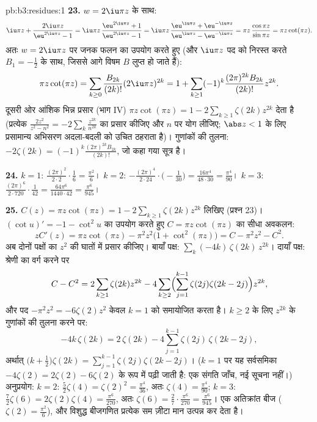 \begin{solution}{pb:b3:residues:1}
\textbf{23.} $w = 2\iu\pi z$ के साथ:
\[
\iu\pi z + \frac{2\iu\pi z}{\eu^{2\iu\pi z} - 1}
= \iu\pi z\,\frac{\eu^{2\iu\pi z} + 1}{\eu^{2\iu\pi z} - 1}
= \iu\pi z\,\frac{\eu^{\iu\pi z} +
\eu^{-\iu\pi z}}{\eu^{\iu\pi z} - \eu^{-\iu\pi z}}
= \pi z\,\frac{\cos\pi z}{\sin\pi z} = \pi z\cot(\pi z) .
\]
अतः $w = 2\iu\pi z$ पर जनक फलन का उपयोग करते हुए (और $\iu\pi z$ पद को निरस्त करते
$B_1 = -\frac12$ के साथ, जिससे आगे विषम $B$ लुप्त हो जाते हैं):
\[
\pi z\cot(\pi z) = \sum_{k\geq0}\frac{B_{2k}}{(2k)!}
(2\iu\pi z)^{2k}
= 1 + \sum_{k\geq1}(-1)^k\frac{(2\pi)^{2k}B_{2k}}{(2k)!}
z^{2k} .
\]
दूसरी ओर आंशिक भिन्न प्रसार (भाग IV) $\pi z\cot(\pi z) = 1 - 2\sum_{k\geq1}\zeta(2k)z^{2k}$ देता है (प्रत्येक $\frac{2z^2}{z^2 - n^2} =
-2\sum_k\frac{z^{2k}}{n^{2k}}$
का प्रसार कीजिए और $n$ पर योग लीजिए; $\abs z < 1$ के लिए प्रसामान्य अभिसरण
अदला-बदली को उचित ठहराता है)। गुणांकों की तुलना: $-2\zeta(2k) =
(-1)^k\frac{(2\pi)^{2k}B_{2k}}{(2k)!}$, जो कहा गया
सूत्र है।

\textbf{24.} $k = 1$: $\frac{(2\pi)^2}{2\cdot2}\cdot\frac16
= \frac{\pi^2}6$। $k = 2$: $-\frac{(2\pi)^4}{2\cdot24}
\cdot\bigl(-\frac1{30}\bigr) = \frac{16\pi^4}{48\cdot30} =
\frac{\pi^4}{90}$। $k = 3$: $\frac{(2\pi)^6}{2\cdot720}
\cdot\frac1{42} = \frac{64\pi^6}{1440\cdot42} =
\frac{\pi^6}{945}$।

\textbf{25.} $C(z) = \pi z\cot(\pi z) = 1 -
2\sum_{k\geq1}\zeta(2k)z^{2k}$ लिखिए (प्रश्न 23)। $(\cot u)'
= -1 - \cot^2u$ का उपयोग करते हुए $C = \pi z\cot(\pi z)$
का सीधा अवकलन:
\[
zC'(z) = \pi z\cot(\pi z) - \pi^2z^2\bigl(1 +
\cot^2(\pi z)\bigr) = C - \pi^2z^2 - C^2 .
\]
अब दोनों पक्षों का $z^2$ की घातों में प्रसार कीजिए। बायाँ पक्ष:
$\sum_k(-4k)\,\zeta(2k)\,z^{2k}$। दायाँ पक्ष: श्रेणी का वर्ग करने पर
\[
C - C^2 = 2\sum_{k\geq1}\zeta(2k)z^{2k}
- 4\sum_{k\geq2}\Bigl(\sum_{j=1}^{k-1}\zeta(2j)
\zeta(2k-2j)\Bigr)z^{2k},
\]
और पद $-\pi^2z^2 = -6\zeta(2)z^2$ केवल $k =
1$ को समायोजित करता है। $k \geq 2$ के लिए $z^{2k}$ के
गुणांकों की तुलना करने पर:
\[
-4k\,\zeta(2k) = 2\,\zeta(2k) -
4\sum_{j=1}^{k-1}\zeta(2j)\,\zeta(2k-2j),
\]
अर्थात् $\bigl(k + \frac12\bigr)\zeta(2k) =
\sum_{j=1}^{k-1}\zeta(2j)\zeta(2k-2j)$। ($k = 1$ पर यह सर्वसमिका $-4\zeta(2) = 2\zeta(2) - 6\zeta(2)$ के रूप में पढ़ी जाती है:
एक संगति जाँच, नई सूचना नहीं।) अनुप्रयोग: $k =
2$: $\frac52\zeta(4) = \zeta(2)^2 = \frac{\pi^4}{36}$, अतः $\zeta(4) = \frac{\pi^4}{90}$;
$k = 3$: $\frac72\zeta(6) =
2\zeta(2)\zeta(4) = \frac{\pi^6}{270}$, अतः $\zeta(6) =
\frac{2}{7}\cdot\frac{\pi^6}{270} = \frac{\pi^6}{945}$। एक अतिक्रांत बीज ($\zeta(2) = \frac{\pi^2}6$), और विशुद्ध बीजगणित
प्रत्येक सम ज़ीटा मान उत्पन्न कर देता है।
\end{solution}
